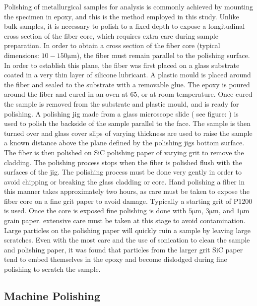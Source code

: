Polishing of metallurgical samples for analysis is commonly achieved by mounting the specimen in epoxy, and this is the method employed in this study. Unlike bulk samples, it is necessary to polish to a fixed depth to expose a longitudinal cross section of the fiber core, which requires extra care during sample preparation. In order to obtain a cross section of the fiber core (typical dimensions: $10 - 150 \si{\micro\meter}$), the fiber must remain parallel to the polishing surface. In order to establish this plane, the fiber was first placed on a glass substrate coated in a very thin layer of silicone lubricant. A plastic mould is placed around the fiber and sealed to the substrate with a removable glue. The epoxy is poured around the fiber and cured in an oven at 65, or at room temperature. Once cured the sample is removed from the substrate and plastic mould, and is ready for polishing. A polishing jig made from a glass microscope slide ( see figure: ) is used to polish the backside of the sample parallel to the face. The sample is then turned over and glass cover slips of varying thickness are used to raise the sample a known distance above the plane defined by the polishing jigs bottom surface. The fiber is then polished on SiC polishing paper of varying grit to remove the cladding. The polishing process stops when the fiber is polished flush with the surfaces of the jig. The polishing process must be done very gently in order to avoid chipping or breaking the glass cladding or core. Hand polishing a fiber in this manner takes approximately two hours, as care must be taken to expose the fiber core on a fine grit paper to avoid damage. Typically a  starting grit of P1200 is used. Once the core is exposed fine polishing is done with $5 \si{\micro\meter}$, $3 \si{\micro\meter}$, and $1 \si{\micro\meter}$ grain paper. extensive care must be taken at this stage to avoid contamination. Large particles on the polishing paper will quickly ruin a sample by leaving large scratches. Even with the most care and the use of sonication to clean the sample and polishing paper, it was found that particles from the larger grit SiC paper tend to embed themselves in the epoxy and become dislodged during fine polishing to scratch the sample. 


\subsection{Machine Polishing}

